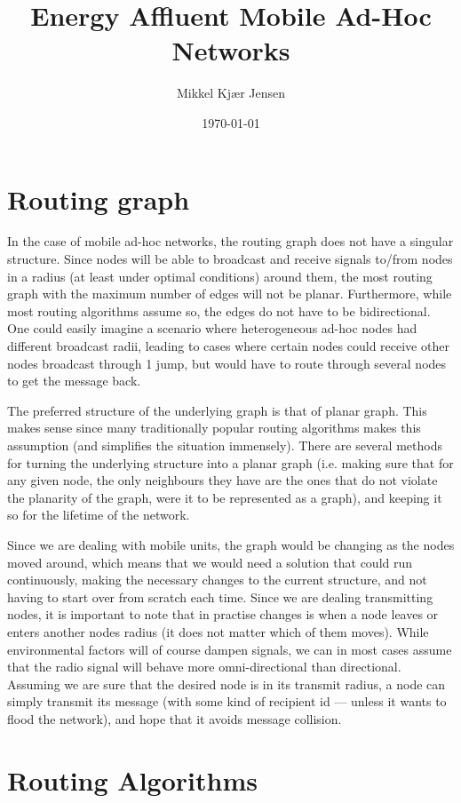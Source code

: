\documentclass[letter, 12pt, english, draft]{article}
\title{Energy Affluent Mobile Ad-Hoc Networks}
\author{Mikkel Kjær Jensen}
\date{\today}
\begin{document}
\pagestyle{fancy}

\section{Routing graph}

In the case of mobile ad-hoc networks, the routing graph does not have a singular structure. Since nodes will be able to broadcast and receive signals to/from nodes in a radius (at least under optimal conditions) around them, the most routing graph with the maximum number of edges will not be planar. Furthermore, while most routing algorithms assume so, the edges do not have to be bidirectional. One could easily imagine a scenario where heterogeneous ad-hoc nodes had different broadcast radii, leading to cases where certain nodes could receive other nodes broadcast through 1 jump, but would have to route through several nodes to get the message back.

The preferred structure of the underlying graph is that of planar graph. This makes sense since many traditionally popular routing algorithms makes this assumption (and simplifies the situation immensely). There are several methods for turning the underlying structure into a planar graph (i.e. making sure that for any given node, the only neighbours they have are the ones that do not violate the planarity of the graph, were it to be represented as a graph), and keeping it so for the lifetime of the network.

Since we are dealing with mobile units, the graph would be changing as the nodes moved around, which means that we would need a solution that could run continuously, making the necessary changes to the current structure, and not having to start over from scratch each time. Since we are dealing transmitting nodes, it is important to note that in practise changes is when a node leaves or enters another nodes radius (it does not matter which of them moves). While environmental factors will of course dampen signals, we can in most cases assume that the radio signal will behave more omni-directional than directional. Assuming we are sure that the desired node is in its transmit radius, a node can simply transmit its message (with some kind of recipient id --- unless it wants to flood the network), and hope that it avoids message collision.   

\section{Routing Algorithms}
\end{document}
